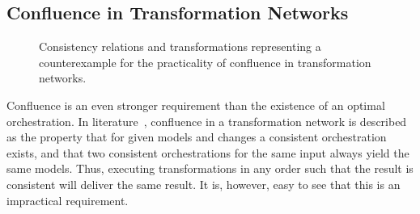 \subsection{Confluence in Transformation Networks}
\label{chap:orchestration:decidability:confluence}

\begin{figure}
    \centering
    
    \caption[Confluence of transformations counterexample]{Consistency relations and transformations representing a counterexample for the practicality of confluence in transformation networks.}
    \label{fig:orchestration:confluence}
\end{figure}

Confluence is an even stronger requirement than the existence of an optimal orchestration.
In literature~\cite{stevens2020BidirectionalTransformationLarge-SoSym}, confluence in a transformation network is described as the property that for given models and changes a consistent orchestration exists, and that two consistent orchestrations for the same input always yield the same models.
Thus, executing transformations in any order such that the result is consistent will deliver the same result.
It is, however, easy to see that this is an impractical requirement.

